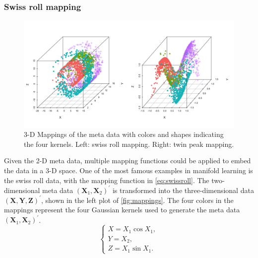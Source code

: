 \documentclass[11pt,a4paper,]{article}
\begin{document}
\hypertarget{swiss-roll-mapping}{%
\subsubsection{Swiss roll mapping}\label{swiss-roll-mapping}}

\begin{figure}

{\centering \includegraphics[width=0.8\linewidth]{figures/mappings_sr_tp} 

}

\caption{3-D Mappings of the meta data with colors and shapes indicating the four kernels. Left: swiss roll mapping. Right: twin peak mapping.}\label{fig:mappings}
\end{figure}

Given the 2-D meta data, multiple mapping functions could be applied to
embed the data in a 3-D space. One of the most famous examples in
manifold learning is the swiss roll data, with the mapping function in
\eqref{eq:swissroll}. The two-dimensional meta data
\((\pmb{X}_1, \pmb{X}_2)^\prime\) is transformed into the
three-dimensional data \((\pmb{X}, \pmb{Y}, \pmb{Z})^\prime\), shown in
the left plot of \autoref{fig:mappings}. The four colors in the mappings
represent the four Gaussian kernels used to generate the meta data
\((\pmb{X}_1, \pmb{X}_2)^\prime\). \begin{equation}
\label{eq:swissroll}
\left\{
\begin{array}{lcl}
X = X_1 \cos{X_1}, \\
Y = X_2, \\
Z = X_1 \sin{X_1}.
\end{array}
\right.
\end{equation}
\end{document}
